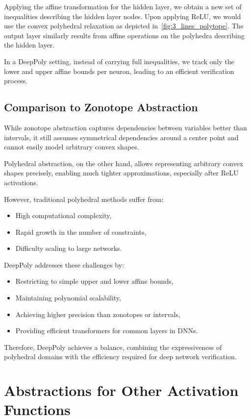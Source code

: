 \documentclass[oneside,11pt,dvipsnames]{book}
\numberwithin{equation}{section}
\theoremstyle{definition}
\theoremstyle{remark}
\begin{document}
Applying the affine transformation for the hidden layer, we obtain a new set of inequalities describing the hidden layer nodes. Upon applying ReLU, we would use the convex polyhedral relaxation as depicted in~\autoref{fig:3_lines_polytope}. The output layer similarly results from affine operations on the polyhedra describing the hidden layer.

In a DeepPoly setting, instead of carrying full inequalities, we track only the lower and upper affine bounds per neuron, leading to an efficient verification process.

\subsection{Comparison to Zonotope Abstraction}

While zonotope abstraction captures dependencies between variables better than intervals, it still assumes symmetrical dependencies around a center point and cannot easily model arbitrary convex shapes.

Polyhedral abstraction, on the other hand, allows representing arbitrary convex shapes precisely, enabling much tighter approximations, especially after ReLU activations.

However, traditional polyhedral methods suffer from:
\begin{itemize}
    \item High computational complexity,
    \item Rapid growth in the number of constraints,
    \item Difficulty scaling to large networks.
\end{itemize}

DeepPoly addresses these challenges by:
\begin{itemize}
    \item Restricting to simple upper and lower affine bounds,
    \item Maintaining polynomial scalability,
    \item Achieving higher precision than zonotopes or intervals,
    \item Providing efficient transformers for common layers in DNNs.
\end{itemize}

Therefore, DeepPoly achieves a balance, combining the expressiveness of polyhedral domains with the efficiency required for deep network verification.


\section{Abstractions for Other Activation Functions}
\end{document}
